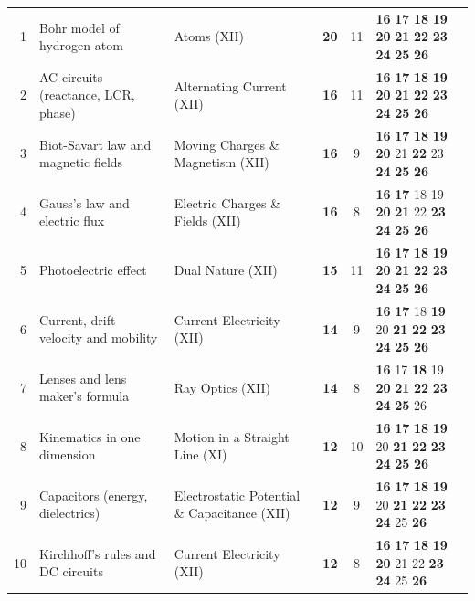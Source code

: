 {\begin{tabularx}{\linewidth}{@{}r@{\hspace{6pt}}>{\raggedright\arraybackslash}Xlcc@{\hspace{6pt}}l@{}}
1 & Bohr model of hydrogen atom & Atoms (XII) & \textbf{20} & 11 & {\scriptsize \textbf{16} \textbf{17} \textbf{18} \textbf{19} \textbf{20} \textbf{21} \textbf{22} \textbf{23} \textbf{24} \textbf{25} \textbf{26}}\\
2 & AC circuits (reactance, LCR, phase) & Alternating Current (XII) & \textbf{16} & 11 & {\scriptsize \textbf{16} \textbf{17} \textbf{18} \textbf{19} \textbf{20} \textbf{21} \textbf{22} \textbf{23} \textbf{24} \textbf{25} \textbf{26}}\\
3 & Biot-Savart law and magnetic fields & Moving Charges \& Magnetism (XII) & \textbf{16} & 9 & {\scriptsize \textbf{16} \textbf{17} \textbf{18} \textbf{19} \textbf{20} {\color{gray!45}21} \textbf{22} {\color{gray!45}23} \textbf{24} \textbf{25} \textbf{26}}\\
4 & Gauss's law and electric flux & Electric Charges \& Fields (XII) & \textbf{16} & 8 & {\scriptsize \textbf{16} \textbf{17} {\color{gray!45}18} {\color{gray!45}19} \textbf{20} \textbf{21} {\color{gray!45}22} \textbf{23} \textbf{24} \textbf{25} \textbf{26}}\\
5 & Photoelectric effect & Dual Nature (XII) & \textbf{15} & 11 & {\scriptsize \textbf{16} \textbf{17} \textbf{18} \textbf{19} \textbf{20} \textbf{21} \textbf{22} \textbf{23} \textbf{24} \textbf{25} \textbf{26}}\\
6 & Current, drift velocity and mobility & Current Electricity (XII) & \textbf{14} & 9 & {\scriptsize \textbf{16} \textbf{17} {\color{gray!45}18} \textbf{19} {\color{gray!45}20} \textbf{21} \textbf{22} \textbf{23} \textbf{24} \textbf{25} \textbf{26}}\\
7 & Lenses and lens maker's formula & Ray Optics (XII) & \textbf{14} & 8 & {\scriptsize \textbf{16} {\color{gray!45}17} \textbf{18} {\color{gray!45}19} \textbf{20} \textbf{21} \textbf{22} \textbf{23} \textbf{24} \textbf{25} {\color{gray!45}26}}\\
8 & Kinematics in one dimension & Motion in a Straight Line (XI) & \textbf{12} & 10 & {\scriptsize \textbf{16} \textbf{17} \textbf{18} \textbf{19} {\color{gray!45}20} \textbf{21} \textbf{22} \textbf{23} \textbf{24} \textbf{25} \textbf{26}}\\
9 & Capacitors (energy, dielectrics) & Electrostatic Potential \& Capacitance (XII) & \textbf{12} & 9 & {\scriptsize \textbf{16} \textbf{17} \textbf{18} \textbf{19} {\color{gray!45}20} \textbf{21} \textbf{22} \textbf{23} \textbf{24} {\color{gray!45}25} \textbf{26}}\\
10 & Kirchhoff's rules and DC circuits & Current Electricity (XII) & \textbf{12} & 8 & {\scriptsize \textbf{16} \textbf{17} \textbf{18} \textbf{19} \textbf{20} {\color{gray!45}21} {\color{gray!45}22} \textbf{23} \textbf{24} {\color{gray!45}25} \textbf{26}}\\

\end{tabularx}}
